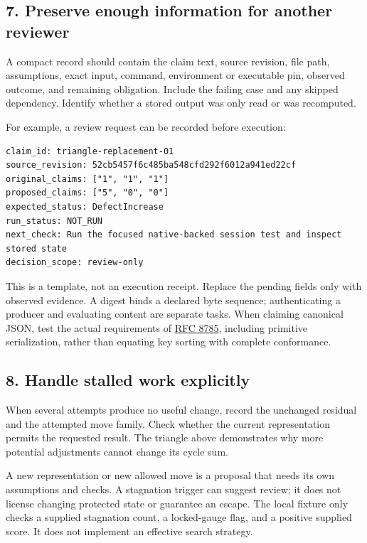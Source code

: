 \documentclass[
  11pt,
]{article}
\begin{document}
\hypertarget{preserve-enough-information-for-another-reviewer}{%
\subsection{7. Preserve enough information for another
reviewer}\label{preserve-enough-information-for-another-reviewer}}

A compact record should contain the claim text, source revision, file
path, assumptions, exact input, command, environment or executable pin,
observed outcome, and remaining obligation. Include the failing case and
any skipped dependency. Identify whether a stored output was only read
or was recomputed.

For example, a review request can be recorded before execution:

\begin{lstlisting}
claim_id: triangle-replacement-01
source_revision: 52cb5457f6c485ba548cfd292f6012a941ed22cf
original_claims: ["1", "1", "1"]
proposed_claims: ["5", "0", "0"]
expected_status: DefectIncrease
run_status: NOT_RUN
next_check: Run the focused native-backed session test and inspect stored state
decision_scope: review-only
\end{lstlisting}

This is a template, not an execution receipt. Replace the pending fields
only with observed evidence. A digest binds a declared byte sequence;
authenticating a producer and evaluating content are separate tasks.
When claiming canonical JSON, test the actual requirements of
\href{https://www.rfc-editor.org/rfc/rfc8785}{RFC 8785}, including
primitive serialization, rather than equating key sorting with complete
conformance.

\hypertarget{handle-stalled-work-explicitly}{%
\subsection{8. Handle stalled work
explicitly}\label{handle-stalled-work-explicitly}}

When several attempts produce no useful change, record the unchanged
residual and the attempted move family. Check whether the current
representation permits the requested result. The triangle above
demonstrates why more potential adjustments cannot change its cycle sum.

A new representation or new allowed move is a proposal that needs its
own assumptions and checks. A stagnation trigger can suggest review; it
does not license changing protected state or guarantee an escape. The
local fixture only checks a supplied stagnation count, a locked-gauge
flag, and a positive supplied score. It does not implement an effective
search strategy.
\end{document}
